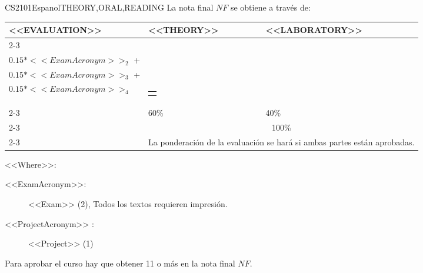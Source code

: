   \begin{evaluation}{CS2101}{Espanol}{THEORY,ORAL,READING}
  La nota final $NF$ se obtiene a través de:
 
  \begin{tabularx}{0.9\textwidth}{|X|p{}|p{}|} \hline
  \multirow{4}{*}{\uppercase{<<Evaluation>>}} & \uppercase{<<Theory>>} & \uppercase{<<Laboratory>>} \\ \cline{2-3}
  & %
      \begin{minipage}{0.95\textwidth}
      \begin{tabular}{l}
          $0.15* <<ExamAcronym>>_{1}$ + \\  
          $0.15* <<ExamAcronym>>_{2}$ + \\ 
          $0.15* <<ExamAcronym>>_{3}$ + \\  
          $0.15* <<ExamAcronym>>_{4}$
      \end{tabular} 
      \end{minipage} 
  & %
      \begin{minipage}{0.95\textwidth}
      \begin{tabular}{l}
          $0.40*<<ProjectAcronym>>_{1}$
          \end{tabular} 
      \end{minipage}                 \\ \cline{2-3}
  
  & %
  60\% 
  & %
  40\% \\ \cline{2-3}
  & \multicolumn{2}{|c|}{100\%}  \\ \cline{2-3}
  & \multicolumn{2}{|c|}{La ponderación de la evaluación se hará si ambas partes están aprobadas.}  \\ \hline
  \end{tabularx}
  
  \vspace{2mm}
  \noindent <<Where>>:
  \begin{description}
      \item[<<ExamAcronym>>:] <<Exam>> (2), Todos los textos requieren impresión.
      \item[<<ProjectAcronym>> :] <<Project>> (1)
  \end{description}
      
  \noindent Para aprobar el curso hay que obtener 11 o más en la nota final $NF$.
  \end{evaluation}
 
